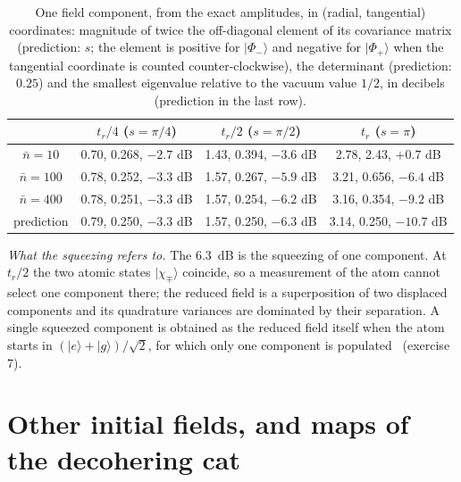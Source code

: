 \documentclass{iopjournal}
\newcommand{\nbar}{\bar{n}}
\newcommand{\ket}[1]{|#1\rangle}
\begin{document}
\begin{table}
\centering
\caption{One field component, from the exact amplitudes, in (radial, tangential) coordinates: magnitude of twice the off-diagonal element of its covariance matrix (prediction: $s$; the element is positive for $\ket{\Phi_-}$ and negative for $\ket{\Phi_+}$ when the tangential coordinate is counted counter-clockwise), the determinant (prediction: $0.25$) and the smallest eigenvalue relative to the vacuum value $1/2$, in decibels (prediction in the last row).}
\begin{tabular}{cccc}
\hline
 & $t_r/4$ ($s = \pi/4$) & $t_r/2$ ($s = \pi/2$) & $t_r$ ($s = \pi$) \\
\hline
$\nbar = 10$ & 0.70, 0.268, $-2.7$ dB & 1.43, 0.394, $-3.6$ dB & 2.78, 2.43, $+0.7$ dB \\
$\nbar = 100$ & 0.78, 0.252, $-3.3$ dB & 1.57, 0.267, $-5.9$ dB & 3.21, 0.656, $-6.4$ dB \\
$\nbar = 400$ & 0.78, 0.251, $-3.3$ dB & 1.57, 0.254, $-6.2$ dB & 3.16, 0.354, $-9.2$ dB \\
prediction & 0.79, 0.250, $-3.3$ dB & 1.57, 0.250, $-6.3$ dB & 3.14, 0.250, $-10.7$ dB \\
\hline
\end{tabular}
\label{tab:S-squeezing}
\end{table}

\textit{What the squeezing refers to.} The 6.3~dB is the squeezing of one component. At $t_r/2$ the two atomic states $\ket{\chi_\mp}$ coincide, so a measurement of the atom cannot select one component there; the reduced field is a superposition of two displaced components and its quadrature variances are dominated by their separation. A single squeezed component is obtained as the reduced field itself when the atom starts in $(\ket{e}+\ket{g})/\sqrt2$, for which only one component is populated~\cite{S-gea1991} (exercise 7).

\section{Other initial fields, and maps of the decohering cat}
\end{document}
